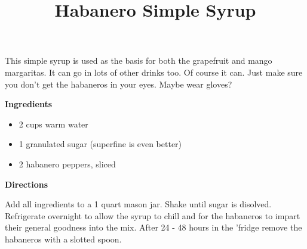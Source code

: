 \documentclass{article}
\title{Habanero Simple Syrup}
\begin{document}
This simple syrup is used as the basis for both the grapefruit and mango margaritas. It can go in
lots of other drinks too. Of course it can. Just make sure you don't get the habaneros in your
eyes. Maybe wear gloves?

\textbf{Ingredients}

\begin{itemize}
    \item 2 cups warm water
    \item 1 granulated sugar (superfine is even better)
    \item 2 habanero peppers, sliced
\end{itemize}

\textbf{Directions}


Add all ingredients to a 1 quart mason jar. Shake until sugar is disolved. Refrigerate
overnight to allow the syrup to chill and for the habaneros to impart their general
goodness into the mix. After 24 - 48 hours in the 'fridge remove the habaneros with a
slotted spoon.

\end{document}
